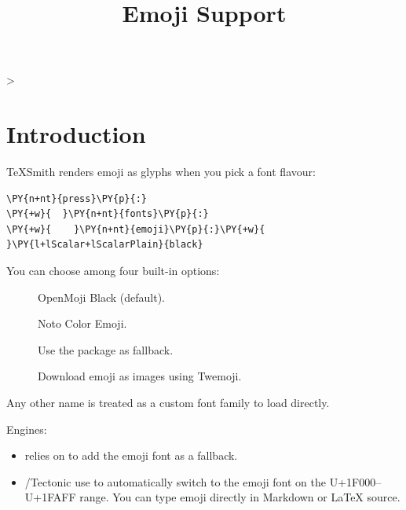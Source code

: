 \documentclass[a4paper,twoside]{article}
\title{Emoji Support}
\author{}\date{}
\makeatletter
\newcommand\tsreplayfn{
\ts@loopcnt\z@
\loop
\advance\ts@loopcnt\@ne
\ifnum\ts@loopcnt>\ts@affilcnt\else
\xdef\@thefnmark{\csname ts@affilM\the\ts@loopcnt\endcsname}
\@footnotetext{\csname ts@affilT\the\ts@loopcnt\endcsname}
\repeat
}
\makeatother
\begin{document}
\twocolumn[{
\maketitle
}]
\tsreplayfn
\section{Introduction}
TeXSmith renders emoji as glyphs when you pick a font flavour:
\begin{tscode}[lang=yaml, engine=pygments]
\begin{Verbatim}[commandchars=\\\{\},breaklines, breakanywhere, commandchars=\\\{\}]
\PY{n+nt}{press}\PY{p}{:}
\PY{+w}{  }\PY{n+nt}{fonts}\PY{p}{:}
\PY{+w}{    }\PY{n+nt}{emoji}\PY{p}{:}\PY{+w}{ }\PY{l+lScalar+lScalarPlain}{black}
\end{Verbatim}
\end{tscode}
You can choose among four built-in options:
\begin{description}
\item[{}] OpenMoji Black (default).
\item[{}] Noto Color Emoji.
\item[{}] Use the  package as fallback.
\item[{}] Download emoji as images using Twemoji.
\end{description}
Any other name is treated as a custom font family to load directly.

Engines:
\begin{itemize}
\item {} relies on  to add the emoji font as a fallback.
\item {}/Tectonic use  to automatically switch to the emoji font on the U+1F000--U+1FAFF range.
You can type emoji directly in Markdown or \LaTeX{} source.
\end{itemize}
\newpage
\end{document}
